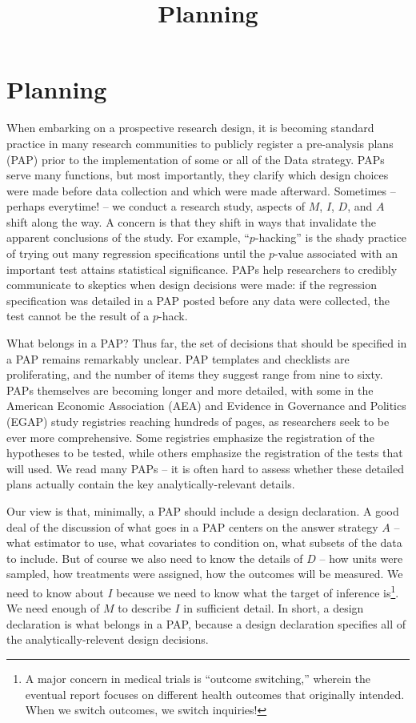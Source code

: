 \documentclass[
]{article}
\title{Planning}
\author{}
\date{\vspace{-2.5em}}
\begin{document}
\maketitle

\hypertarget{planning}{%
\section{Planning}\label{planning}}

When embarking on a prospective research design, it is becoming standard
practice in many research communities to publicly register a
pre-analysis plans (PAP) prior to the implementation of some or all of
the Data strategy. PAPs serve many functions, but most importantly, they
clarify which design choices were made before data collection and which
were made afterward. Sometimes -- perhaps everytime! -- we conduct a
research study, aspects of \(M\), \(I\), \(D\), and \(A\) shift along
the way. A concern is that they shift in ways that invalidate the
apparent conclusions of the study. For example, ``\(p\)-hacking'' is the
shady practice of trying out many regression specifications until the
\(p\)-value associated with an important test attains statistical
significance. PAPs help researchers to credibly communicate to skeptics
when design decisions were made: if the regression specification was
detailed in a PAP posted before any data were collected, the test cannot
be the result of a \(p\)-hack.

What belongs in a PAP? Thus far, the set of decisions that should be
specified in a PAP remains remarkably unclear. PAP templates and
checklists are proliferating, and the number of items they suggest range
from nine to sixty. PAPs themselves are becoming longer and more
detailed, with some in the American Economic Association (AEA) and
Evidence in Governance and Politics (EGAP) study registries reaching
hundreds of pages, as researchers seek to be ever more comprehensive.
Some registries emphasize the registration of the hypotheses to be
tested, while others emphasize the registration of the tests that will
used. We read many PAPs -- it is often hard to assess whether these
detailed plans actually contain the key analytically-relevant details.

Our view is that, minimally, a PAP should include a design declaration.
A good deal of the discussion of what goes in a PAP centers on the
answer strategy \(A\) -- what estimator to use, what covariates to
condition on, what subsets of the data to include. But of course we also
need to know the details of \(D\) -- how units were sampled, how
treatments were assigned, how the outcomes will be measured. We need to
know about \(I\) because we need to know what the target of inference
is\footnote{A major concern in medical trials is ``outcome switching,''
  wherein the eventual report focuses on different health outcomes that
  originally intended. When we switch outcomes, we switch inquiries!}.
We need enough of \(M\) to describe \(I\) in sufficient detail. In
short, a design declaration is what belongs in a PAP, because a design
declaration specifies all of the analytically-relevent design decisions.
\end{document}
